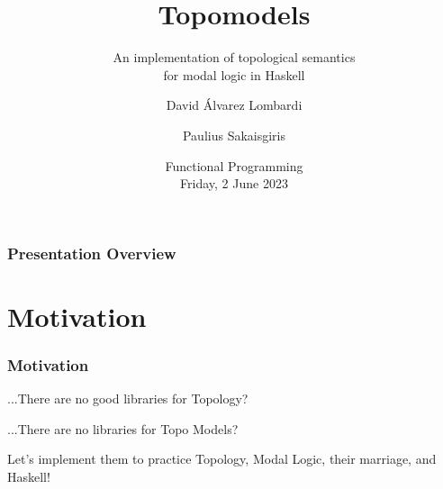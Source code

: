 \documentclass[
	11pt, %
	aspectratio=1610, %
]{beamer}
\title[Topomodels]{Topomodels} %
\subtitle{An implementation of topological semantics \\ for modal logic in Haskell} %
\author[David Álvarez Lombardi \& Paulius Sakaisgiris]{David Álvarez Lombardi \and Paulius Sakaisgiris} %
\institute[ILLC]{Institute for Logic, Language, and Computation \\ \smallskip University of Amsterdam} %
\date[Friday, 2 June 2023]{Functional Programming\\ \smallskip Friday, 2 June 2023} %
\begin{document}

\begin{frame}
	\titlepage %
\end{frame}



\begin{frame}
	\frametitle{Presentation Overview} %

	\tableofcontents[pausesections] %
\end{frame}


\section{Motivation}


\begin{frame}
	\frametitle{Motivation}

	...There are no good libraries for Topology?

	\bigskip

	...There are no libraries for Topo Models?

	Let's implement them to practice Topology, Modal Logic, their marriage, and Haskell!

	\end{frame}
\end{document}
